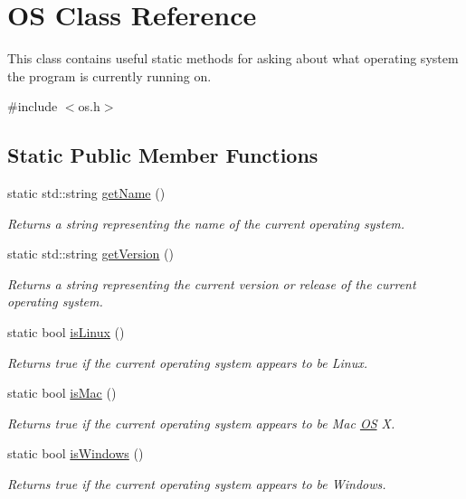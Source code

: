 \hypertarget{classOS}{}\section{OS Class Reference}
\label{classOS}


This class contains useful static methods for asking about what operating system the program is currently running on.  




{\ttfamily \#include $<$os.\+h$>$}

\subsection*{Static Public Member Functions}
\begin{DoxyCompactItemize}
\item 
static std\+::string \mbox{\hyperlink{classOS_ac0fc966d4386ddb71d99361e3fccb311}{get\+Name}} ()
\begin{DoxyCompactList}\small\item\em Returns a string representing the name of the current operating system. \end{DoxyCompactList}\item 
static std\+::string \mbox{\hyperlink{classOS_aee3bd62c6c84d746802c115f5d4c1519}{get\+Version}} ()
\begin{DoxyCompactList}\small\item\em Returns a string representing the current version or release of the current operating system. \end{DoxyCompactList}\item 
static bool \mbox{\hyperlink{classOS_a788e423282dd2f38315986d30bbae63b}{is\+Linux}} ()
\begin{DoxyCompactList}\small\item\em Returns true if the current operating system appears to be Linux. \end{DoxyCompactList}\item 
static bool \mbox{\hyperlink{classOS_a78ccfa2165be4fedb1caa2aca444568c}{is\+Mac}} ()
\begin{DoxyCompactList}\small\item\em Returns true if the current operating system appears to be Mac \mbox{\hyperlink{classOS}{OS}} X. \end{DoxyCompactList}\item 
static bool \mbox{\hyperlink{classOS_a98203f29153132a6da56b0ff5634bdb3}{is\+Windows}} ()
\begin{DoxyCompactList}\small\item\em Returns true if the current operating system appears to be Windows. \end{DoxyCompactList}\end{DoxyCompactItemize}


